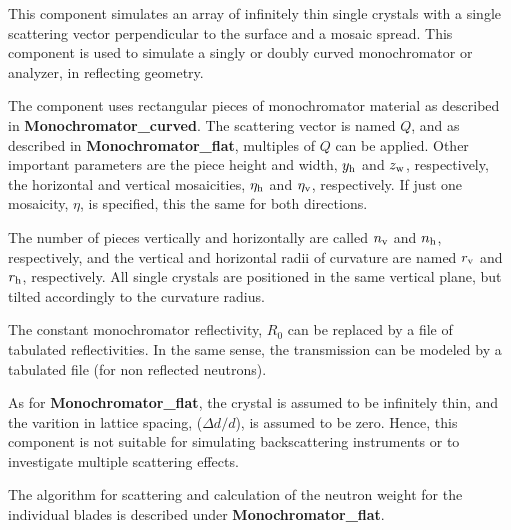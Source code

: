 This component simulates an array of infinitely thin single
crystals with a single scattering vector perpendicular to the
surface and a mosaic spread.
This component is used to simulate a singly or doubly
curved monochromator or analyzer, in reflecting geometry.

The component uses  rectangular pieces of monochromator material
as described in {\bf Monochromator\_curved}.
The scattering vector is named $Q$, and as described in
{\bf Monochromator\_flat}, multiples of $Q$ can be applied.
Other important parameters are the piece height and width,
$y_{\rm h}$ and $z_{\rm w}$, respectively, the
horizontal and vertical mosaicities, $\eta_{\rm h}$ and $\eta_{\rm v}$,
respectively. 
If just one mosaicity, $\eta$, is specified, this the same for both directions.

The number of pieces vertically and horizontally are called
$n_{\rm v}$ and $n_{\rm h}$, respectively, and the vertical and horizontal
radii of curvature are named $r_{\rm v}$ and $r_{\rm h}$, respectively.
All single crystals are positioned in the same vertical plane, 
but tilted accordingly to the curvature radius.

The constant monochromator reflectivity, $R_0$ can be replaced by
a file of tabulated reflectivities. In the same sense, the transmission
can be modeled by a tabulated file (for non reflected neutrons).

As for {\bf Monochromator\_flat}, the crystal is assumed to be infinitely
thin, and the varition in lattice spacing, ($\Delta d/d$),
is assumed to be zero. Hence, this
component is not suitable for simulating backscattering instruments or to
investigate multiple scattering effects.

The algorithm for scattering and calculation of the neutron weight for
the individual blades is described under {\bf Monochromator\_flat}.
